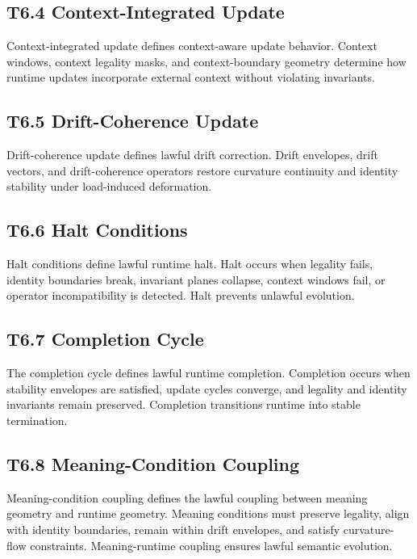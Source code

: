\subsection{T6.4 Context-Integrated Update}
Context-integrated update defines context-aware update behavior. Context
windows, context legality masks, and context-boundary geometry determine how
runtime updates incorporate external context without violating invariants.

\subsection{T6.5 Drift-Coherence Update}
Drift-coherence update defines lawful drift correction. Drift envelopes, drift
vectors, and drift-coherence operators restore curvature continuity and identity
stability under load-induced deformation.

\subsection{T6.6 Halt Conditions}
Halt conditions define lawful runtime halt. Halt occurs when legality fails,
identity boundaries break, invariant planes collapse, context windows fail, or
operator incompatibility is detected. Halt prevents unlawful evolution.

\subsection{T6.7 Completion Cycle}
The completion cycle defines lawful runtime completion. Completion occurs when
stability envelopes are satisfied, update cycles converge, and legality and
identity invariants remain preserved. Completion transitions runtime into
stable termination.

\subsection{T6.8 Meaning-Condition Coupling}
Meaning-condition coupling defines the lawful coupling between meaning geometry
and runtime geometry. Meaning conditions must preserve legality, align with
identity boundaries, remain within drift envelopes, and satisfy curvature-flow
constraints. Meaning-runtime coupling ensures lawful semantic evolution.
